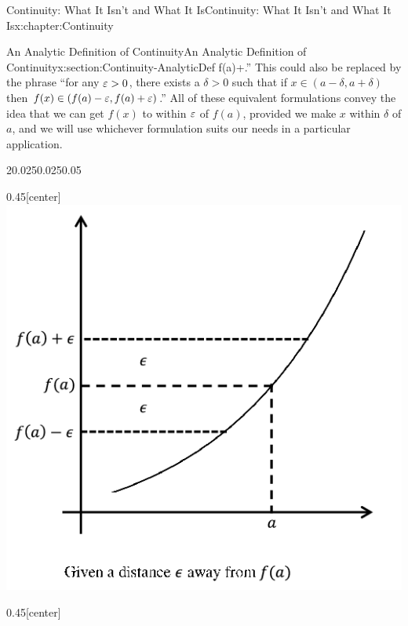 \begin{chapterptx}{Continuity: What It Isn't and What It Is}{}{Continuity: What It Isn't and What It Is}{}{}{x:chapter:Continuity}
\begin{sectionptx}{An Analytic Definition of Continuity}{}{An Analytic Definition of Continuity}{}{}{x:section:Continuity-AnalyticDef}
		f(a)+\eps\).'' This could also be replaced by the phrase ``for any \(\varepsilon>0\), there exists a \(\delta>0\) such that if \(x\in(a-\delta,a+\delta)\) then \(f(x)\in(f(a)-\varepsilon,f(a)+\varepsilon)\).'' All of these equivalent formulations convey the idea that we can get \(f(x)\) to within \(\varepsilon\) of \(f(a)\), provided we make \(x\) within \(\delta\) of \(a\), and we will use whichever formulation suits our needs in a particular application.%
		\begin{sidebyside}{2}{0.025}{0.025}{0.05}%
			\begin{sbspanel}{0.45}[center]%
				\includegraphics[width=\linewidth]{external/images/Ch5fig3a.png}
			\end{sbspanel}%
			\begin{sbspanel}{0.45}[center]%

\end{sbspanel}
\end{sidebyside}
\end{sectionptx}
\end{chapterptx}
